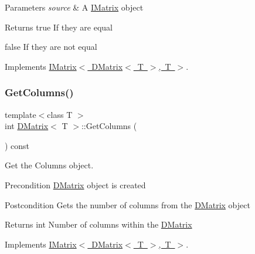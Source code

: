 \begin{DoxyParams}{Parameters}
{\em source} & A \mbox{\hyperlink{class_i_matrix}{I\+Matrix}} object \\
\hline
\end{DoxyParams}
\begin{DoxyReturn}{Returns}
true If they are equal 

false If they are not equal 
\end{DoxyReturn}


Implements \mbox{\hyperlink{class_i_matrix_afa03122ed7ddb531656ce27690f8fb03}{I\+Matrix$<$ D\+Matrix$<$ T $>$, T $>$}}.

\mbox{\label{class_d_matrix_a1a2b5bfdc2b11980472e4754cca4f80e}} 
\subsubsection{\texorpdfstring{GetColumns()}{GetColumns()}}
{\footnotesize\ttfamily template$<$class T $>$ \\
int \mbox{\hyperlink{class_d_matrix}{D\+Matrix}}$<$ T $>$\+::Get\+Columns (\begin{DoxyParamCaption}{ }\end{DoxyParamCaption}) const\hspace{0.3cm}{\ttfamily [virtual]}}



Get the Columns object. 

\begin{DoxyPrecond}{Precondition}
\mbox{\hyperlink{class_d_matrix}{D\+Matrix}} object is created 
\end{DoxyPrecond}
\begin{DoxyPostcond}{Postcondition}
Gets the number of columns from the \mbox{\hyperlink{class_d_matrix}{D\+Matrix}} object 
\end{DoxyPostcond}
\begin{DoxyReturn}{Returns}
int Number of columns within the \mbox{\hyperlink{class_d_matrix}{D\+Matrix}} 
\end{DoxyReturn}


Implements \mbox{\hyperlink{class_i_matrix_a3b84da3898ef38bdf281c13f218fc278}{I\+Matrix$<$ D\+Matrix$<$ T $>$, T $>$}}.

\mbox{\label{class_d_matrix_a0dd457392462f79180d401a09bb5c676}} 

